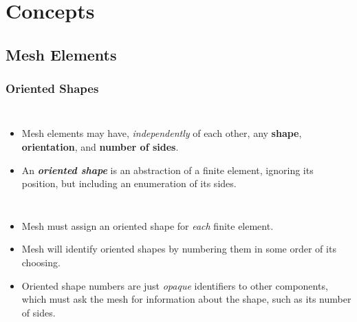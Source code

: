 \documentclass[compress]{beamer}
\begin{document}
\section{Concepts}

\subsection{Mesh Elements}

\begin{frame}
  \frametitle{Oriented Shapes}
  \begin{columns}
      \pause
      \begin{itemize}[<+->]
        \item Mesh elements may have, \emph{independently} of each other, any \textbf{shape}, \textbf{orientation}, and \textbf{number of sides}.
        \item An \textbf{\emph{oriented shape}} is an abstraction of a finite element, ignoring its position, but including an enumeration of
          its sides. 
      \end{itemize}
  \end{columns}
  
  \begin{itemize}[<+->]
    \item Mesh must assign an oriented shape for \emph{each} finite element. 
    \item Mesh will identify oriented shapes by numbering them in some order of its choosing.
    \item Oriented shape numbers are just \emph{opaque} identifiers to other components, which must ask the mesh for information
      about the shape, such as its number of sides.
  \end{itemize}
\end{frame}
\end{document}
